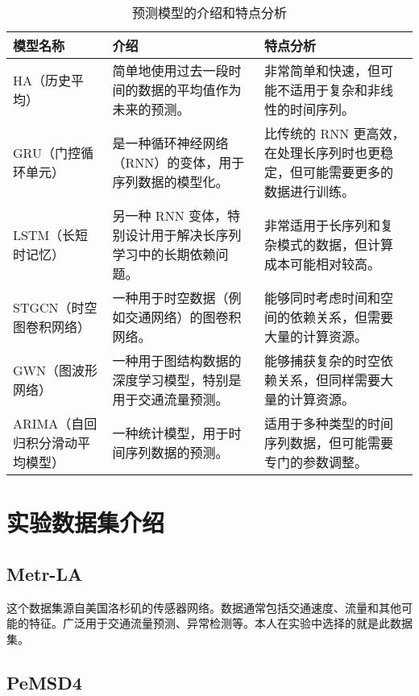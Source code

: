 \documentclass[4pt]{article}
\begin{document}
\begin{table}[H]
    \centering
    \small %
    \begin{tabularx}{\textwidth}{|X|X|X|}
        \hline
        \textbf{模型名称} & \textbf{介绍} & \textbf{特点分析} \\
        \hline
        HA（历史平均） & 简单地使用过去一段时间的数据的平均值作为未来的预测。 & 非常简单和快速，但可能不适用于复杂和非线性的时间序列。 \\
        \hline
        GRU（门控循环单元） & 是一种循环神经网络（RNN）的变体，用于序列数据的模型化。 & 比传统的 RNN 更高效，在处理长序列时也更稳定，但可能需要更多的数据进行训练。 \\
        \hline
        LSTM（长短时记忆） & 另一种 RNN 变体，特别设计用于解决长序列学习中的长期依赖问题。 & 非常适用于长序列和复杂模式的数据，但计算成本可能相对较高。 \\
        \hline
        STGCN（时空图卷积网络） & 一种用于时空数据（例如交通网络）的图卷积网络。 & 能够同时考虑时间和空间的依赖关系，但需要大量的计算资源。 \\
        \hline
        GWN（图波形网络） & 一种用于图结构数据的深度学习模型，特别是用于交通流量预测。 & 能够捕获复杂的时空依赖关系，但同样需要大量的计算资源。 \\
        \hline
        ARIMA（自回归积分滑动平均模型） & 一种统计模型，用于时间序列数据的预测。 & 适用于多种类型的时间序列数据，但可能需要专门的参数调整。 \\
        \hline
    \end{tabularx}
    \caption{预测模型的介绍和特点分析}
    \label{tab:model_analysis}
    \normalsize %
\end{table}

\section{实验数据集介绍}


\subsection{Metr-LA}

这个数据集源自美国洛杉矶的传感器网络。数据通常包括交通速度、流量和其他可能的特征。广泛用于交通流量预测、异常检测等。本人在实验中选择的就是此数据集。

\subsection{PeMSD4}
\end{document}
